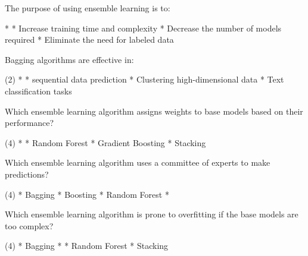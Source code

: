 \documentclass[10pt]{extarticle}
\begin{document}
\begin{exercise}
    The purpose of using ensemble learning is to:
    \begin{choice}
        * 
        * Increase training time and complexity
        * Decrease the number of models required
        * Eliminate the need for labeled data
    \end{choice}
\end{exercise}
\begin{solution}
\end{solution}

\begin{exercise}
    Bagging algorithms are effective in:
    \begin{choice}(2)
        * 
        * sequential data prediction
        * Clustering high-dimensional data
        * Text classification tasks
    \end{choice}
\end{exercise}
\begin{solution}
\end{solution}

\begin{exercise}
    Which ensemble learning algorithm assigns weights to base models based on their performance?
    \begin{choice} (4)
        * 
        * Random Forest
        * Gradient Boosting
        * Stacking
    \end{choice}
\end{exercise}
\begin{solution}
\end{solution}

\begin{exercise}
    Which ensemble learning algorithm uses a committee of experts to make predictions?
    \begin{choice} (4)
        * Bagging
        * Boosting
        * Random Forest
        * 
    \end{choice}
\end{exercise}
\begin{solution}
\end{solution}

\begin{exercise}
    Which ensemble learning algorithm is prone to overfitting if the base models are too complex?
    \begin{choice} (4)
        * Bagging
        * 
        * Random Forest
        * Stacking
    \end{choice}
\end{exercise}
\begin{solution}
\end{solution}
\end{document}
